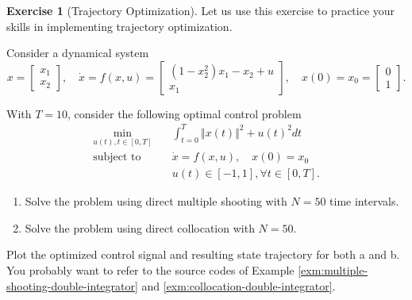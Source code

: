 \documentclass[
]{book}
\theoremstyle{definition}
\theoremstyle{definition}
\theoremstyle{definition}
\newtheorem{exercise}{Exercise}[chapter]
\theoremstyle{definition}
\theoremstyle{remark}
\begin{document}
\begin{exercise}[Trajectory Optimization]
\protect\hypertarget{exr:shooting-and-collocation}{}\label{exr:shooting-and-collocation}Let us use this exercise to practice your skills in implementing trajectory optimization.

Consider a dynamical system
\[
x = \begin{bmatrix}
x_1 \\ x_2
\end{bmatrix}, \quad \dot{x} = f(x,u) = \begin{bmatrix}
(1-x_2^2)x_1 - x_2 + u \\
x_1 
\end{bmatrix}, \quad x(0) = x_0 = \begin{bmatrix} 0 \\ 1 \end{bmatrix}.
\]

With \(T=10\), consider the following optimal control problem
\begin{equation}
\begin{split}
\min_{u(t),t \in [0,T]} & \quad \int_{t=0}^T \Vert x(t) \Vert^2 + u(t)^2 dt \\
\text{subject to} & \quad \dot{x} = f(x,u), \quad x(0) = x_0 \\
& \quad u(t) \in [-1,1],\forall t \in [0,T].
\end{split}
\end{equation}

\begin{enumerate}
\def\labelenumi{\alph{enumi}.}
\item
  Solve the problem using direct multiple shooting with \(N=50\) time intervals.
\item
  Solve the problem using direct collocation with \(N=50\).
\end{enumerate}

Plot the optimized control signal and resulting state trajectory for both a and b. You probably want to refer to the source codes of Example \ref{exm:multiple-shooting-double-integrator} and \ref{exm:collocation-double-integrator}.
\end{exercise}

~
\end{document}
